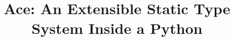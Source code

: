 \documentclass[10pt,preprint]{sigplanconf}
\begin{document}
\conferenceinfo{-}{-} 
\copyrightyear{-} 
\copyrightdata{[to be supplied]} 


\newcommand{\Ace}{\textsf{Ace}}

\title{\Ace: An Extensible Static Type System Inside a Python}

\authorinfo{~}{~}{~}

\maketitle
\end{document}

